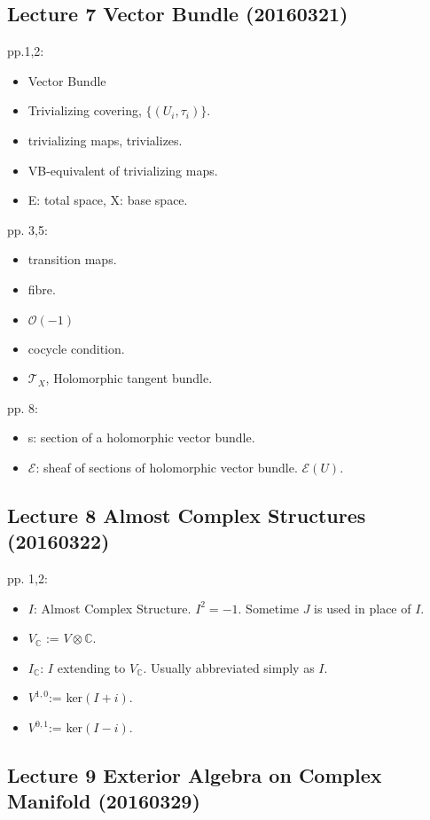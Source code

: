 \documentclass{article}
\numberwithin{equation}{subsection} %
\begin{document}
	\subsection{Lecture 7 Vector Bundle (20160321)}
	pp.1,2:
	\begin{itemize}
		\item Vector Bundle
		\item Trivializing covering, $\{(U_i,\tau_i)\}$.
		\item trivializing maps, trivializes.
		\item VB-equivalent of trivializing maps.
		\item E: total space, X: base space.
	\end{itemize}
	pp. 3,5:
	\begin{itemize}
		\item transition maps.
		\item fibre.
		\item $\mathcal{O}(-1)$
		\item cocycle condition.
		\item $\mathcal{T}_X$, Holomorphic tangent bundle.
	\end{itemize}
	pp. 8:
	\begin{itemize}
		\item s: section of a holomorphic vector bundle.
		\item $\mathcal{E}$: sheaf of sections of holomorphic vector bundle. $\mathcal{E}(U)$.
	\end{itemize}
	
	\subsection{Lecture 8 Almost Complex Structures (20160322)}
	pp. 1,2:
	\begin{itemize}
		\item $I$: Almost Complex Structure. $I^2=-1$. Sometime $J$ is used in place of $I$.
		\item $V_{\mathbb{C}}$ := $V\otimes \mathbb{C}$.
		\item $I_\mathbb{C}$: $I$ extending to $V_{\mathbb{C}}$. Usually abbreviated simply as $I$.
		\item $V^{1,0}$:= ker$(I+i)$.
		\item $V^{0,1}$:= ker$(I-i)$.
	\end{itemize}
	
	\subsection{Lecture 9 Exterior Algebra on Complex Manifold (20160329)}
	
\end{document}
